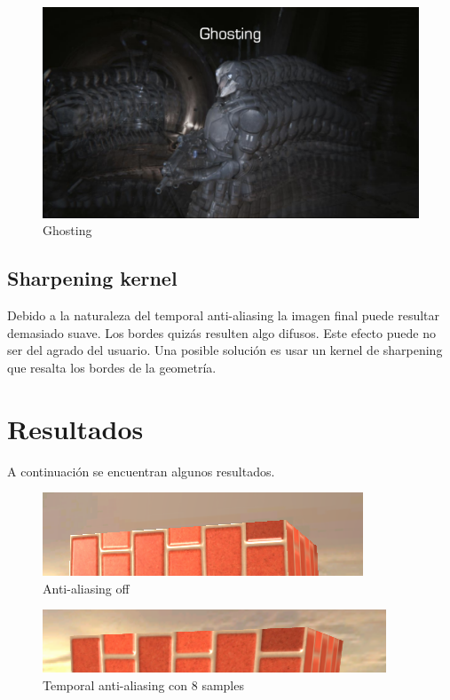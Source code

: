 \documentclass[withindex, glossary]{cam-thesis}
\begin{document}
\begin{figure}[!htbp]
    \includegraphics[width=.8\linewidth]{figures/ghosting.png}
    \caption{Ghosting\cite{unrealtaa}}
    \label{ghosting}
\end{figure}

\section{Sharpening kernel}

Debido a la naturaleza del temporal anti-aliasing la imagen final puede resultar demasiado suave. Los bordes quizás resulten algo difusos. Este efecto puede no ser del agrado del usuario. Una posible solución es usar un kernel de sharpening que resalta los bordes de la geometría.

\chapter{Resultados}

A continuación se encuentran algunos resultados.

\begin{figure}[!htbp]
    \includegraphics[width=\linewidth]{figures/taaoff.png}
    \caption{Anti-aliasing off}
    \label{aaoff}
\end{figure}

\begin{figure}[!htbp]
    \includegraphics[width=\linewidth]{figures/taa8.png}
    \caption{Temporal anti-aliasing con 8 samples}
    \label{taa8}
\end{figure}
\end{document}

